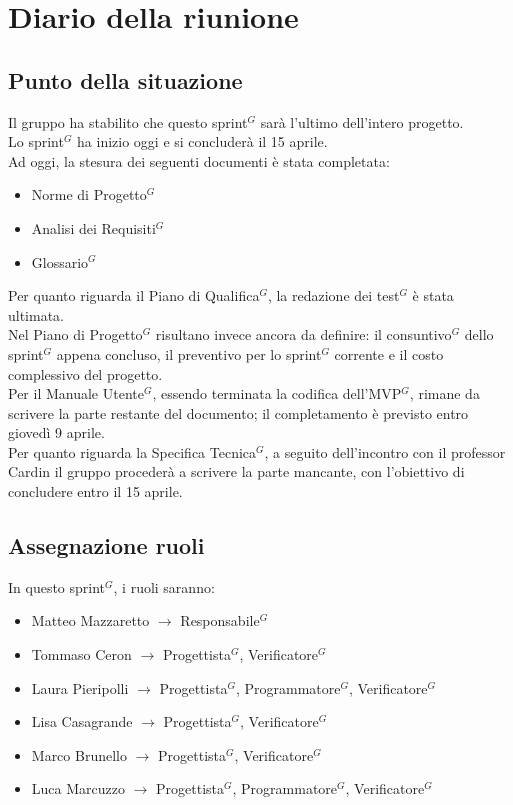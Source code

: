 \section{Diario della riunione}

\subsection{Punto della situazione}
Il gruppo ha stabilito che questo sprint$^G$ sarà l'ultimo dell'intero progetto. \\
Lo sprint$^G$ ha inizio oggi e si concluderà il 15 aprile. \\
Ad oggi, la stesura dei seguenti documenti è stata completata:
\begin{itemize}
	\item Norme di Progetto$^G$
	\item Analisi dei Requisiti$^G$
	\item Glossario$^G$
\end{itemize}
Per quanto riguarda il Piano di Qualifica$^G$, la redazione dei test$^G$ è stata ultimata. \\
Nel Piano di Progetto$^G$ risultano invece ancora da definire: il consuntivo$^G$ dello sprint$^G$ appena concluso, il preventivo per lo sprint$^G$ corrente e il costo complessivo del progetto. \\
Per il Manuale Utente$^G$, essendo terminata la codifica dell'MVP$^G$, rimane da scrivere la parte restante del documento; il completamento è previsto entro giovedì 9 aprile. \\
Per quanto riguarda la Specifica Tecnica$^G$, a seguito dell'incontro con il professor Cardin il gruppo procederà a scrivere la parte mancante, con l'obiettivo di concludere entro il 15 aprile.

\subsection{Assegnazione ruoli}
In questo sprint$^G$, i ruoli saranno:
\begin{itemize}
	\item Matteo Mazzaretto $\rightarrow$ Responsabile$^G$
	\item Tommaso Ceron $\rightarrow$ Progettista$^G$, Verificatore$^G$
	\item Laura Pieripolli $\rightarrow$ Progettista$^G$, Programmatore$^G$, Verificatore$^G$
	\item Lisa Casagrande $\rightarrow$ Progettista$^G$, Verificatore$^G$
	\item Marco Brunello $\rightarrow$ Progettista$^G$, Verificatore$^G$
	\item Luca Marcuzzo $\rightarrow$ Progettista$^G$, Programmatore$^G$, Verificatore$^G$
\end{itemize}


